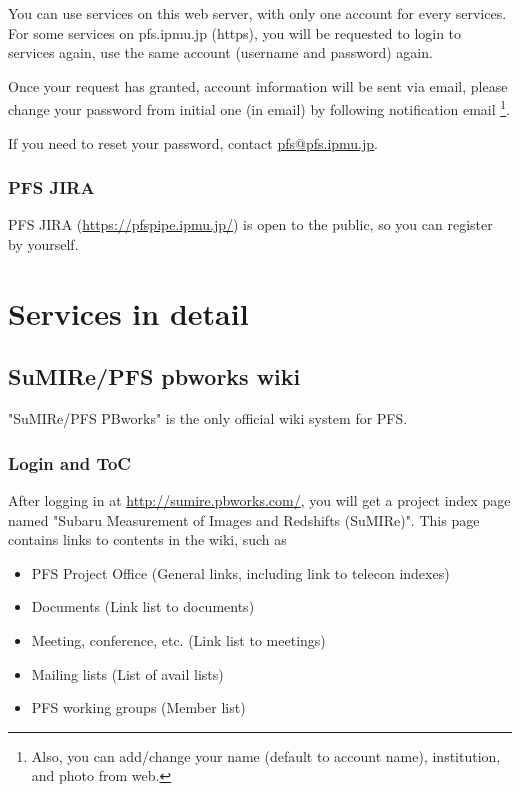 \documentclass[a4paper,notitlepage]{article}
\begin{document}
You can use services on this web server, with only one account for every 
services.
For some services on pfs.ipmu.jp (https), you will be requested to login 
to services again, use the same account (username and password) again. 

Once your request has granted, 
account information will be sent via email, please change your password 
from initial one (in email) by following notification email 
\footnote{Also, you can add/change your name (default to account name), 
institution, and photo from web.}. 

If you need to reset your password, contact \url{pfs@pfs.ipmu.jp}. 

\subsubsection{PFS JIRA}

PFS JIRA (\url{https://pfspipe.ipmu.jp/}) is open to the public, 
so you can register by yourself. 


\section{Services in detail}

\subsection{SuMIRe/PFS pbworks wiki}

"SuMIRe/PFS PBworks" is the only official wiki system for PFS. 

\subsubsection{Login and ToC}

After logging in at \url{http://sumire.pbworks.com/}, 
you will get a project index page named 
"Subaru Measurement of Images and Redshifts (SuMIRe)". 
This page contains links to contents in the wiki, such as 

\begin{itemize}
  \item PFS Project Office (General links, including link to telecon indexes)
  \item Documents (Link list to documents)
  \item Meeting, conference, etc.  (Link list to meetings)
  \item Mailing lists (List of avail lists)
  \item PFS working groups (Member list)
\end{itemize}
\end{document}
